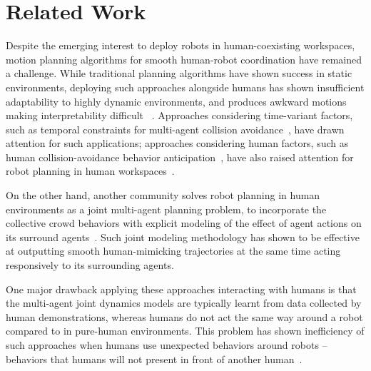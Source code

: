 \documentclass[letterpaper, 10 pt, conference]{ieeeconf}  %
\begin{document}
\section{Related Work}
Despite the emerging interest to deploy robots in human-coexisting workspaces, 
motion planning algorithms for smooth human-robot coordination have remained a 
challenge. While traditional planning algorithms have shown success in static 
environments, deploying such approaches alongside humans has shown 
insufficient adaptability to highly dynamic environments, and produces awkward 
motions making 
interpretability difficult
~\cite{lichtenthaler2012influence,dragan2013legibility,kruse2012legible}. 
Approaches considering time-variant factors, such as temporal constraints for multi-agent collision 
avoidance~\cite{van2011reciprocal}, have drawn attention for such 
applications; approaches considering human factors, such as human 
collision-avoidance behavior anticipation~\cite{helbing1995social}, have also raised attention for robot planning in human workspaces~\cite{shiomi2014towards}.

On the other hand, another community solves robot planning in human environments as a 
joint multi-agent planning problem, to incorporate the collective crowd 
behaviors with explicit modeling of the effect of agent actions on its 
surround agents~\cite{trautman2010unfreezing,kuderer2012feature,mavrogiannis2016decentralized}. Such joint modeling methodology has 
shown to be effective at outputting smooth human-mimicking trajectories at the same 
time acting responsively to its surrounding agents.

One major drawback applying these approaches interacting with humans is that the 
multi-agent joint dynamics models are typically learnt from data collected by 
human demonstrations, whereas humans do not act the same way around a robot compared to in 
pure-human environments. This problem has shown 
inefficiency of such approaches when humans use unexpected behaviors 
around robots -- behaviors that humans will not present in front of another 
human~\cite{pfeiffer2016predicting}. 
\end{document}
